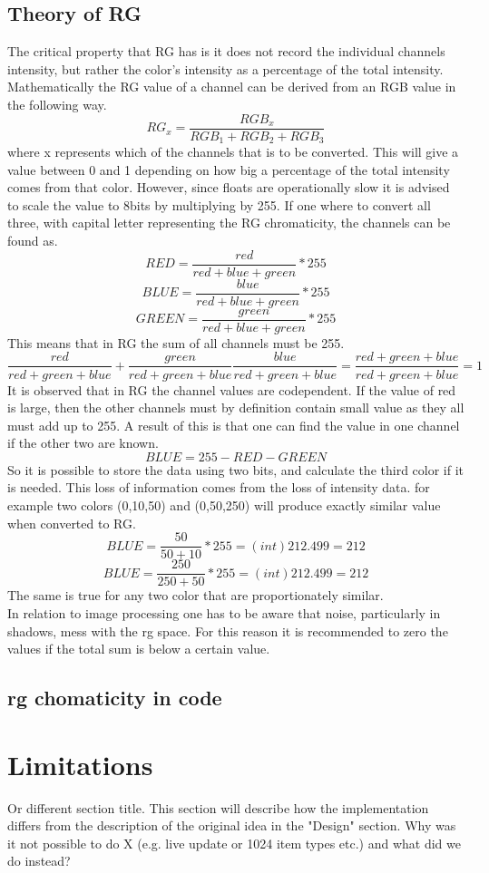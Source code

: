 \subsection{Theory of RG} 
The critical property that RG has is it does not record the individual channels intensity, but rather the color's intensity as a percentage of the total intensity. Mathematically the RG value of a channel can be derived from an RGB value in the following way.
\[ RG_x = \frac{RGB_x}{RGB_1 + RGB_2 + RGB_3}\]
where x represents which of the channels that is to be converted. This will give a value between 0 and 1 depending on how big a percentage of the total intensity comes from that color. However, since floats are operationally slow it is advised to scale the value to 8bits by multiplying by 255. If one where to convert all three, with capital letter representing the RG chromaticity, the channels can be found as.
\[ RED = \frac{red}{red + blue + green} * 255\]
\[ BLUE = \frac{blue}{red + blue + green} * 255\]
\[ GREEN = \frac{green}{red + blue + green} * 255\]
This means that in RG the sum of all channels must be 255.
\[ \frac{red}{red + green + blue} + \frac{green}{red + green + blue} \frac{blue}{red + green + blue} =  \frac{red + green + blue}{red + green + blue} = 1\]
It is observed that in RG the channel values are codependent. If the value of red is large, then the other channels must by definition contain small value as they all must add up to 255. A result of this is that one can find the value in one channel if the other two are known.
\[ BLUE = 255 - RED - GREEN\]
So it is possible to store the data using two bits, and calculate the third color if it is needed. This loss of information comes from the loss of intensity data\cite{NormRGB}. for example two colors (0,10,50) and (0,50,250) will produce exactly similar value when converted to RG. 
\[ BLUE = \frac{50}{50 + 10} * 255 = (int)212.499 = 212 \]
\[ BLUE = \frac{250}{250 + 50} * 255 = (int)212.499 = 212 \]
The same is true for any two color that are proportionately similar.\\
In relation to image processing one has to be aware that noise, particularly in shadows, mess with the rg space. For this reason it is recommended to zero the values if the total sum is below a certain value.

\subsection{rg chomaticity in code}




\section{Limitations}
Or different section title. This section will describe how the implementation differs from the description of the original idea in the "Design" section. Why was it not possible to do X (e.g. live update or 1024 item types etc.) and what did we do instead?